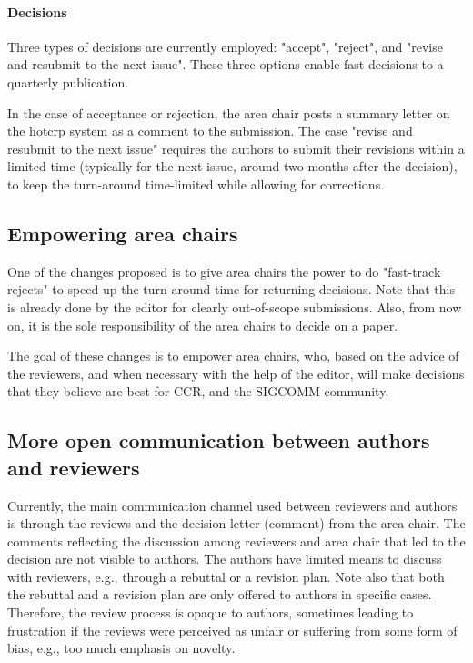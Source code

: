 \documentclass[sigconf]{acmart}
\begin{document}
\paragraph{Decisions}
Three types of decisions are currently employed: "accept", "reject", and "revise and resubmit to the next issue". These three options enable fast decisions to a quarterly publication.

In the case of acceptance or rejection, the area chair posts a summary letter on the hotcrp system as a comment to the submission. The case "revise and resubmit to the next issue" requires the authors to submit their revisions within a limited time (typically for the next issue, around two months after the decision), to keep the turn-around time-limited while allowing for corrections.

\subsection{Empowering area chairs}
\label{subsec:area-chairs}

One of the changes proposed is to give area chairs the power to do "fast-track rejects" to speed up the turn-around time for returning decisions. Note that this is already done by the editor for clearly out-of-scope submissions. Also, from now on, it is the sole responsibility of the area chairs to decide on a paper. 

The goal of these changes is to empower area chairs, who, based on the advice of the reviewers, and when necessary with the help of the editor, will make decisions that they believe are best for CCR, and the SIGCOMM community.

\subsection{More open communication between authors and reviewers}
\label{subsec:comm}

Currently, the main communication channel used between reviewers and authors is through the reviews and the decision letter (comment) from the area chair. The comments reflecting the discussion among reviewers and area chair that led to the decision are not visible to authors. The authors have limited means to discuss with reviewers, e.g., through a rebuttal or a revision plan. Note also that both the rebuttal and a revision plan are only offered to authors in specific cases. Therefore, the review process is opaque to authors, sometimes leading to frustration if the reviews were perceived as unfair or suffering from some form of bias, e.g., too much emphasis on novelty. 
\end{document}
